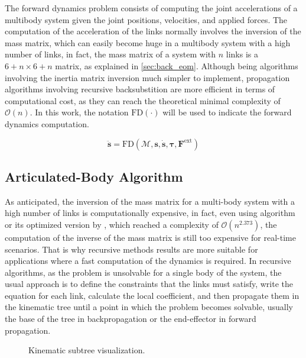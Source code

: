 The forward dynamics problem consists of computing the joint accelerations of a multibody system given the joint positions, velocities, and applied forces. The computation of the acceleration of the links normally involves the inversion of the mass matrix, which can easily become huge in a multibody system with a high number of links, in fact, the mass matrix of a system with $n$ links is a $6+n \times 6+n$ matrix, as explained in \cref{sec:back_eom}. Although being algorithms involving the inertia matrix inversion much simpler to implement, propagation algorithms involving recursive backsubstition are more efficient in terms of computational cost, as they can reach the theoretical minimal complexity of $\mathcal{O}(n)$. In this work, the notation $\mathrm{FD}(\cdot)$ will be used to indicate the forward dynamics computation.

\begin{equation}
    \ddot{\mathbf{s}} = \mathrm{FD} (\mathcal{M}, \mathbf{s}, \dot{\mathbf{s}}, \boldsymbol{\tau}, \mathbf{F} ^{\text{ext}})
\end{equation}

\subsection{Articulated-Body Algorithm}
\label{subsec:back_aba}

As anticipated, the inversion of the mass matrix for a multi-body system with a high number of links is computationally expensive, in fact, even using \citet{coppersmith_matrix_1990} algorithm or its optimized version by \citet{vassilevska-williams2012breaking}, which reached a complexity of $\mathcal{O}(n^{2.373})$, the computation of the inverse of the mass matrix is still too expensive for real-time scenarios. That is why recursive methods results are more suitable for applications where a fast computation of the dynamics is required. In recursive algorithms, as the problem is unsolvable for a single body of the system, the usual approach is to define the constraints that the links must satisfy, write the equation for each link, calculate the local coefficient, and then propagate them in the kinematic tree until a point in which the problem becomes solvable, usually the base of the tree in backpropagation or the end-effector in forward propagation.

\begin{figure}
    \centering
    \caption{Kinematic subtree visualization.}
    \label{fig:kin_tree}
\end{figure}

